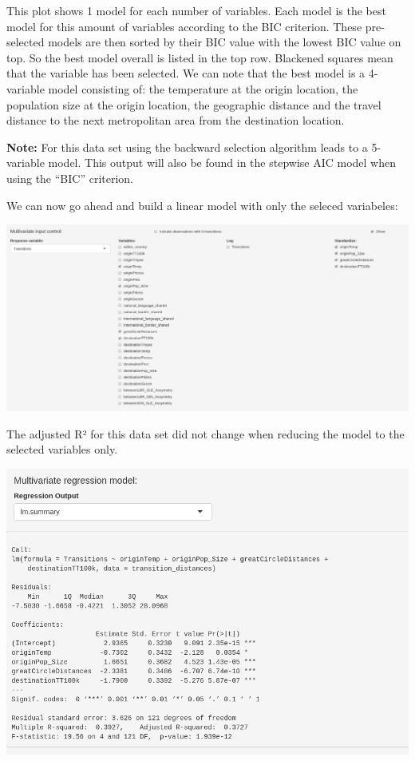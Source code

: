 \documentclass[
]{article}
\begin{document}
This plot shows 1 model for each number of variables. Each model is the
best model for this amount of variables according to the BIC criterion.
These pre-selected models are then sorted by their BIC value with the
lowest BIC value on top. So the best model overall is listed in the top
row. Blackened squares mean that the variable has been selected. We can
note that the best model is a 4-variable model consisting of: the
temperature at the origin location, the population size at the origin
location, the geographic distance and the travel distance to the next
metropolitan area from the destination location.

\textbf{Note:} For this data set using the backward selection algorithm
leads to a 5-variable model. This output will also be found in the
stepwise AIC model when using the ``BIC'' criterion.

We can now go ahead and build a linear model with only the seleced
variabeles:

\includegraphics{tutorial_img/Variable_SelectionSelected.png}

The adjusted R² for this data set did not change when reducing the model
to the selected variables only.

\includegraphics{tutorial_img/summary_multi_selected.png}
\end{document}
